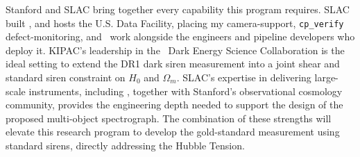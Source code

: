 Stanford and SLAC bring together every capability this program requires. 
SLAC built \LSSTCam, and hosts the U.S. Data Facility, placing my camera-support, \texttt{cp\_verify} defect-monitoring, and \ToO\ work alongside the engineers and pipeline developers who deploy it. 
KIPAC's leadership in the \LSST\ Dark Energy Science Collaboration is the ideal setting to extend the DR1 dark siren measurement into a joint shear and standard siren constraint on $H_0$ and $\Omega_m$. 
SLAC's expertise in delivering large-scale instruments, including \LSSTCam, together with Stanford's observational cosmology community, provides the engineering depth needed to support the design of the proposed multi-object spectrograph. 
The combination of these strengths will elevate this research program to develop the gold-standard measurement using standard sirens, directly addressing the Hubble Tension.